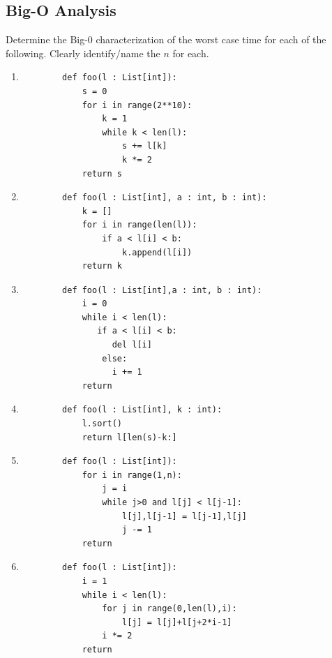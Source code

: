 \documentclass[10pt]{article}
\begin{document}
\subsection*{Big-O Analysis}

Determine the Big-0 characterization of the worst case time for each of the following. Clearly identify/name the $n$ for each. 

\begin{enumerate}
    \item \begin{verbatim}
        def foo(l : List[int]):
            s = 0
            for i in range(2**10):
                k = 1
                while k < len(l):
                    s += l[k]
                    k *= 2
            return s
    \end{verbatim}
    \vspace{1.5in}

    \item \begin{verbatim}
        def foo(l : List[int], a : int, b : int):
            k = []
            for i in range(len(l)):
                if a < l[i] < b:
                    k.append(l[i])
            return k
    \end{verbatim}
    \vspace{1.5in}

    \item \begin{verbatim}
        def foo(l : List[int],a : int, b : int):
            i = 0
            while i < len(l):
               if a < l[i] < b:
                  del l[i]
                else:
                  i += 1
            return 
    \end{verbatim}
    \newpage \thispagestyle{empty}

    \item \begin{verbatim}
        def foo(l : List[int], k : int):
            l.sort()
            return l[len(s)-k:] 
    \end{verbatim}
    \vspace{2in}
    \item \begin{verbatim}
        def foo(l : List[int]):
            for i in range(1,n):
                j = i
                while j>0 and l[j] < l[j-1]:
                    l[j],l[j-1] = l[j-1],l[j]
                    j -= 1
            return 
    \end{verbatim}
    \vspace{2in}
    \item \begin{verbatim}
        def foo(l : List[int]):
            i = 1
            while i < len(l):
                for j in range(0,len(l),i):
                    l[j] = l[j]+l[j+2*i-1]
                i *= 2
            return         
    \end{verbatim}
\end{enumerate}
\end{document}
